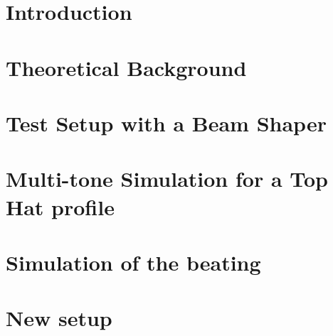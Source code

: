 \documentclass[
class=book,
accentcolor=1b,
custommargins=geometry,
fontsize=11pt,
thesis={type=master, reviewer-on-uppertitleback=true}, %
ruledheaders=all,
headline=false,
instbox=false,
marginpar=false,
title=small,
ignore-missing-data=true,
twoside=true, %
pdfx=false, %
IMRAD = false,
logofile=apqdesign/tuda_logo.pdf
]{apqpub}
\begin{document}
    \frontmatter

    \makeatletter
    \if@twoside
    \else%
    \begingroup
    \begin{minipage}[t]{\textwidth}
        \@uppertitleback
    \end{minipage}\par
    \vfill
    \begin{minipage}[b]{\textwidth}
        \@lowertitleback
    \end{minipage}\par
    \@thanks\let\@thanks\@empty
    \endgroup
    \clearpage
    \fi%
    \makeatother


    \tableofcontents
    \printglossary[
    type=abbreviations,
    title=List of Abbreviations,
    nonumberlist]
    
    \mainmatter
  
    \setcounter{page}{1}
    \chapter{Introduction}
    \label{sec:einleitung}
    
    
    \chapter{Theoretical Background}
    \label{sec:theory}
    
    
    \chapter{Test Setup with a Beam Shaper}
    \label{sec:BeamShaperSetup}
    

    \chapter{Multi-tone Simulation for a Top Hat profile}
    \label{sec:constant_simulation}
    
    
    \chapter{Simulation of the beating}
    \label{sec:beating_simulation}
    
    
    \chapter{New setup}
    \label{sec:newsetup}
    
    
\end{document}
